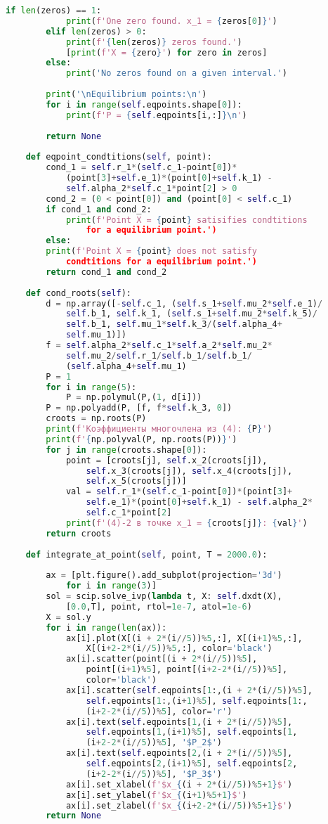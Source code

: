 \begin{lstlisting}[language=Python, showstringspaces=false, caption=Файл \texttt{model.py}.]
		if len(zeros) == 1:
			print(f'One zero found. x_1 = {zeros[0]}')
		elif len(zeros) > 0:
			print(f'{len(zeros)} zeros found.')
			[print(f'X = {zero}') for zero in zeros]
		else:
			print('No zeros found on a given interval.')
		
		print('\nEquilibrium points:\n')
		for i in range(self.eqpoints.shape[0]):
			print(f'P = {self.eqpoints[i,:]}\n')
		
		return None
		
	def eqpoint_condtitions(self, point):
		cond_1 = self.r_1*(self.c_1-point[0])*
			(point[3]+self.e_1)*(point[0]+self.k_1) -
			self.alpha_2*self.c_1*point[2] > 0
		cond_2 = (0 < point[0]) and (point[0] < self.c_1)
		if cond_1 and cond_2:
			print(f'Point X = {point} satisifies condtitions 
				for a equilibrium point.')
		else:
		print(f'Point X = {point} does not satisfy 
			condtitions for a equilibrium point.')
		return cond_1 and cond_2
		
	def cond_roots(self):
		d = np.array([-self.c_1, (self.s_1+self.mu_2*self.e_1)/
			self.b_1, self.k_1, (self.s_1+self.mu_2*self.k_5)/
			self.b_1, self.mu_1*self.k_3/(self.alpha_4+
			self.mu_1)])
		f = self.alpha_2*self.c_1*self.a_2*self.mu_2*
			self.mu_2/self.r_1/self.b_1/self.b_1/
			(self.alpha_4+self.mu_1)
		P = 1
		for i in range(5):
			P = np.polymul(P,(1, d[i]))
		P = np.polyadd(P, [f, f*self.k_3, 0])
		croots = np.roots(P)
		print(f'Коэффициенты многочлена из (4): {P}')
		print(f'{np.polyval(P, np.roots(P))}')
		for j in range(croots.shape[0]):
			point = [croots[j], self.x_2(croots[j]), 
				self.x_3(croots[j]), self.x_4(croots[j]), 
				self.x_5(croots[j])]
			val = self.r_1*(self.c_1-point[0])*(point[3]+
				self.e_1)*(point[0]+self.k_1) - self.alpha_2*
				self.c_1*point[2]
			print(f'(4)-2 в точке x_1 = {croots[j]}: {val}')
		return croots
		
	def integrate_at_point(self, point, T = 2000.0):
		
		ax = [plt.figure().add_subplot(projection='3d') 
			for i in range(3)]
		sol = scip.solve_ivp(lambda t, X: self.dxdt(X), 
			[0.0,T], point, rtol=1e-7, atol=1e-6)
		X = sol.y
		for i in range(len(ax)):
			ax[i].plot(X[(i + 2*(i//5))%5,:], X[(i+1)%5,:],
				X[(i+2-2*(i//5))%5,:], color='black')    
			ax[i].scatter(point[(i + 2*(i//5))%5], 
				point[(i+1)%5], point[(i+2-2*(i//5))%5], 
				color='black')    
			ax[i].scatter(self.eqpoints[1:,(i + 2*(i//5))%5],
				self.eqpoints[1:,(i+1)%5], self.eqpoints[1:,
				(i+2-2*(i//5))%5], color='r')
			ax[i].text(self.eqpoints[1,(i + 2*(i//5))%5], 
				self.eqpoints[1,(i+1)%5], self.eqpoints[1,
				(i+2-2*(i//5))%5], '$P_2$')
			ax[i].text(self.eqpoints[2,(i + 2*(i//5))%5], 
				self.eqpoints[2,(i+1)%5], self.eqpoints[2,
				(i+2-2*(i//5))%5], '$P_3$')
			ax[i].set_xlabel(f'$x_{(i + 2*(i//5))%5+1}$')
			ax[i].set_ylabel(f'$x_{(i+1)%5+1}$')
			ax[i].set_zlabel(f'$x_{(i+2-2*(i//5))%5+1}$')
		return None 
		

\end{lstlisting}
